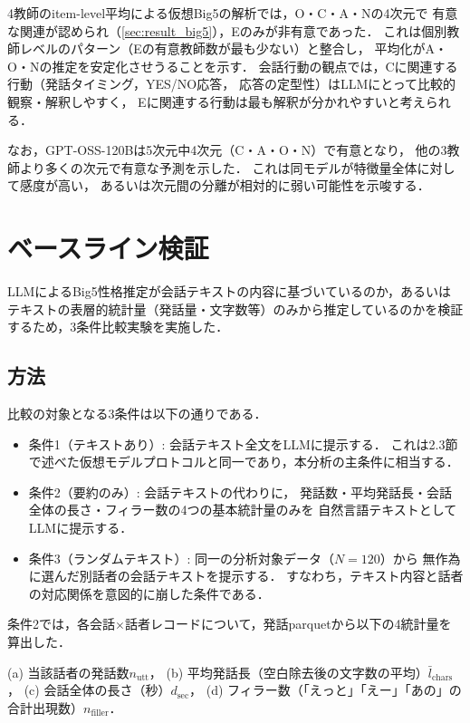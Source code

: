 \documentclass[dvipdfmx,11pt,a4paper]{bxjsarticle}
\renewcommand{\_}{\paperorigunderscore\allowbreak}%
\begin{document}
4教師のitem-level平均による仮想Big5の解析では，O・C・A・Nの4次元で
有意な関連が認められ（\ref{sec:result_big5}），Eのみが非有意であった．
これは個別教師レベルのパターン（Eの有意教師数が最も少ない）と整合し，
平均化がA・O・Nの推定を安定化させうることを示す．
会話行動の観点では，Cに関連する行動（発話タイミング，YES/NO応答，
応答の定型性）はLLMにとって比較的観察・解釈しやすく，
Eに関連する行動は最も解釈が分かれやすいと考えられる．

なお，GPT-OSS-120Bは5次元中4次元（C・A・O・N）で有意となり，
他の3教師より多くの次元で有意な予測を示した．
これは同モデルが特徴量全体に対して感度が高い，
あるいは次元間の分離が相対的に弱い可能性を示唆する．





\section{ベースライン検証}
\label{sec:baseline_validation}

LLMによるBig5性格推定が会話テキストの内容に基づいているのか，あるいはテキストの表層的統計量（発話量・文字数等）のみから推定しているのかを検証するため，3条件比較実験を実施した．

\subsection{方法}
\label{sec:baseline_validation_method}

比較の対象となる3条件は以下の通りである．

\begin{itemize}
  \item 条件1（テキストあり）: 会話テキスト全文をLLMに提示する．
    これは2.3節で述べた仮想モデルプロトコルと同一であり，本分析の主条件に相当する．
  \item 条件2（要約のみ）: 会話テキストの代わりに，
    発話数・平均発話長・会話全体の長さ・フィラー数の4つの基本統計量のみを
    自然言語テキストとしてLLMに提示する．
  \item 条件3（ランダムテキスト）: 同一の分析対象データ（$N = 120$）から
    無作為に選んだ別話者の会話テキストを提示する．
    すなわち，テキスト内容と話者の対応関係を意図的に崩した条件である．
\end{itemize}

条件2では，各会話$\times$話者レコードについて，発話parquetから以下の4統計量を算出した．

(a) 当該話者の発話数$n_{\text{utt}}$，
(b) 平均発話長（空白除去後の文字数の平均）$\bar{l}_{\text{chars}}$，
(c) 会話全体の長さ（秒）$d_{\text{sec}}$，
(d) フィラー数（「えっと」「えー」「あの」の合計出現数）$n_{\text{filler}}$．
\end{document}
